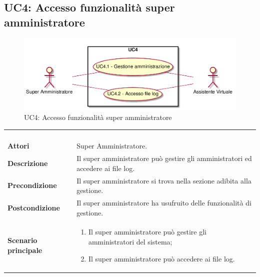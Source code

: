 \newpage\subsection{UC4: Accesso funzionalità super amministratore}
\label{UC4}
\begin{figure}[h]
	\centering
	\includegraphics[width=\textwidth,height=\textheight,keepaspectratio]{images/UseCaseUC4.png}
	\caption{UC4: Accesso funzionalità super amministratore}
\end{figure}
\begin{longtable}{l|p{10cm}}
	\rowcolor[gray]{0.8} \multicolumn{2}{c}{} \\
	\rowcolor[gray]{0.8} \multicolumn{2}{c}{\textbf{UC4 - Accesso funzionalità super amministratore}} \\
	\rowcolor[gray]{0.8} \multicolumn{2}{c}{} \\
	\hline
	&\\
	\textbf{Attori} & Super Amministratore.\\[7pt]
	\textbf{Descrizione} & Il super amministratore può gestire gli amministratori ed accedere ai file log.\\[7pt]
	\textbf{Precondizione} & Il super amministratore si trova nella sezione adibita alla gestione.\\[7pt]
	\textbf{Postcondizione} & Il super amministratore ha usufruito delle funzionalità di gestione.\\[7pt]
	\textbf{Scenario principale} &\begin{enumerate}
		\item  Il super amministratore può gestire gli amministratori del sistema; 
		\item  Il super amministratore può accedere ai file log.
	\end{enumerate}
	\\[7pt]\hline
\end{longtable}

